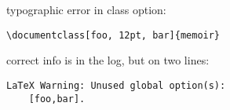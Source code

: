 \documentclass[
foo,
12pt,
bar,
]{article}
\begin{document}
typographic error in class option:

\begin{verbatim}
\documentclass[foo, 12pt, bar]{memoir}
\end{verbatim}

correct info is in the log, but on two lines:
\begin{verbatim}
LaTeX Warning: Unused global option(s):
    [foo,bar].
\end{verbatim}
\end{document}
